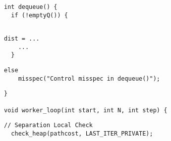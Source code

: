 

\begin{lstlisting}[morekeywords={pathcost,dist}, belowskip=0pt,
firstnumber=9, name=dij_checks, showlines=true]
int dequeue() {
  if (!emptyQ()) {


\end{lstlisting}

\begin{lstlisting}[morekeywords={pathcost,dist}, aboveskip=0pt, belowskip=0pt,
firstnumber=13, name=dij_checks]
    dist = ...
    ...
  }
\end{lstlisting}

  \begin{lstlisting}[morekeywords={pathcost}, aboveskip=0pt,belowskip=0pt,backgroundcolor=\color{lightgray}, firstnumber=auto, name=dij_checks]
  else
    misspec("Control misspec in dequeue()");
\end{lstlisting}

\begin{lstlisting}[morekeywords={pathcost,dist}, aboveskip=0pt, belowskip=0pt,
firstnumber=auto, name=dij_checks,showlines=true]
}

void worker_loop(int start, int N, int step) {

\end{lstlisting}

  \begin{lstlisting}[morekeywords={pathcost}, aboveskip=0pt,belowskip=0pt,backgroundcolor=\color{lightgray},
  firstnumber=auto, name=dij_checks,showlines=true]
  // Separation Local Check
  check_heap(pathcost, LAST_ITER_PRIVATE);
  \end{lstlisting}

